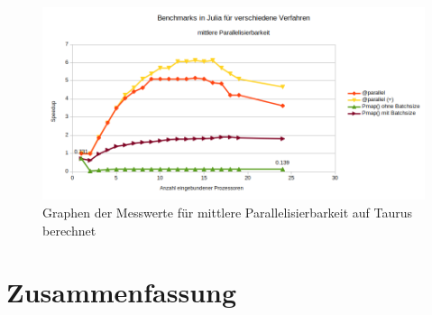 \documentclass[proseminar,german,utf8]{zihpub}
\begin{document}
\begin{figure}
    \centering
    \includegraphics[scale=0.8, width=17cm]{bilder/parallel_performance_taurus_medium}
    \caption{Graphen der Messwerte für mittlere Parallelisierbarkeit auf Taurus berechnet}
    \label{fig:taurusMedium}
\end{figure}
\newpage
\section{Zusammenfassung}
\end{document}

